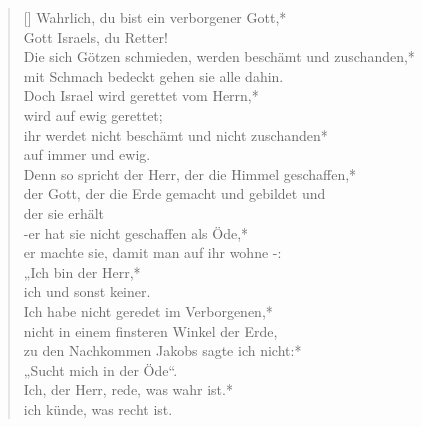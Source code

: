 \begin{verse}[\versewidth]
 Wahrlich, du bist ein verborgener Gott,*\\
Gott Israels, du Retter!\\
\vin Die sich Götzen schmieden, werden beschämt und zuschanden,*\\
\vin mit Schmach bedeckt gehen sie alle dahin.\\
Doch Israel wird gerettet vom Herrn,*\\
wird auf ewig gerettet;\\
\vin ihr werdet nicht beschämt und nicht zuschanden*\\
\vin auf immer und ewig.\\
Denn so spricht der Herr, der die Himmel geschaffen,*\\
der Gott, der die Erde gemacht und gebildet und\\ der sie erhält\\
\vin -er hat sie nicht geschaffen als Öde,*\\
\vin er machte sie, damit man auf ihr wohne -:\\
„Ich bin der Herr,*\\
ich und sonst keiner.\\
\vin Ich habe nicht geredet im Verborgenen,*\\
\vin nicht in einem finsteren Winkel der Erde,\\
zu den Nachkommen Jakobs sagte ich nicht:*\\
„Sucht mich in der Öde“.\\
\vin Ich, der Herr, rede, was wahr ist.*\\
\vin ich künde, was recht ist.\\


\end{verse}
